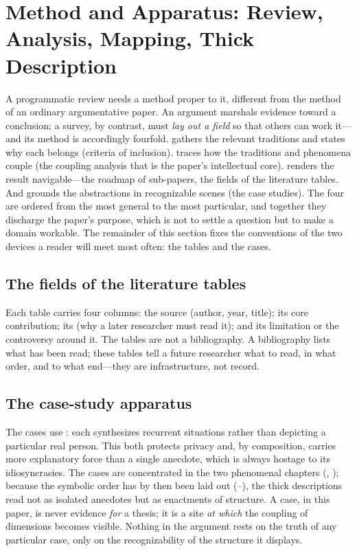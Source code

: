 \section{Method and Apparatus: Review, Analysis, Mapping, Thick Description}\label{p07:sec:method}

A programmatic review needs a method proper to it, different from the method of an ordinary argumentative paper. An argument marshals evidence toward a conclusion; a survey, by contrast, must \emph{lay out a field} so that others can work it---and its method is accordingly fourfold.  gathers the relevant traditions and states why each belongs (criteria of inclusion).  traces how the traditions and phenomena couple (the coupling analysis that is the paper's intellectual core).  renders the result navigable---the roadmap of sub-papers, the fields of the literature tables. And  grounds the abstractions in recognizable scenes (the case studies). The four are ordered from the most general to the most particular, and together they discharge the paper's purpose, which is not to settle a question but to make a domain workable. The remainder of this section fixes the conventions of the two devices a reader will meet most often: the tables and the cases.

\subsection{The fields of the literature tables}
Each table carries four columns: the source (author, year, title); its core contribution; its  (why a later researcher must read it); and its limitation or the controversy around it. The tables are not a bibliography. A bibliography lists what has been read; these tables tell a future researcher what to read, in what order, and to what end---they are infrastructure, not record.

\subsection{The case-study apparatus}
The cases use : each synthesizes recurrent situations rather than depicting a particular real person. This both protects privacy and, by composition, carries more explanatory force than a single anecdote, which is always hostage to its idiosyncrasies. The cases are concentrated in the two phenomenal chapters (, ); because the symbolic order has by then been laid out (--), the thick descriptions read not as isolated anecdotes but as enactments of structure. A case, in this paper, is never evidence \emph{for} a thesis; it is a site \emph{at which} the coupling of dimensions becomes visible. Nothing in the argument rests on the truth of any particular case, only on the recognizability of the structure it displays.

